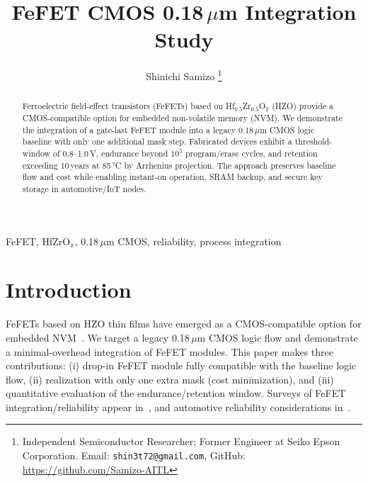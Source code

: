 \documentclass[journal]{IEEEtran}
\begin{document}
\title{FeFET CMOS 0.18\,$\mu$m Integration Study}

\author{Shinichi Samizo%
\thanks{Independent Semiconductor Researcher; Former Engineer at Seiko Epson Corporation.%
\newline Email: \texttt{shin3t72@gmail.com}, GitHub: \url{https://github.com/Samizo-AITL}}}

\maketitle

\begin{abstract}
Ferroelectric field-effect transistors (FeFETs) based on Hf$_{0.5}$Zr$_{0.5}$O$_2$ (HZO) provide a CMOS-compatible option for embedded non-volatile memory (NVM). We demonstrate the integration of a gate-last FeFET module into a legacy 0.18\,$\mu$m CMOS logic baseline with only one additional mask step. Fabricated devices exhibit a threshold-window of 0.8–1.0\,V, endurance beyond $10^5$ program/erase cycles, and retention exceeding 10\,years at 85\,\si{\celsius} by Arrhenius projection. The approach preserves baseline flow and cost while enabling instant-on operation, SRAM backup, and secure key storage in automotive/IoT nodes.
\end{abstract}

\begin{IEEEkeywords}
FeFET, HfZrO$_x$, 0.18\,$\mu$m CMOS, reliability, process integration
\end{IEEEkeywords}

\section{Introduction}
FeFETs based on HZO thin films have emerged as a CMOS-compatible option for embedded NVM~\cite{Boescke2011,Mueller2012,Schenk2019}. We target a legacy 0.18\,$\mu$m CMOS logic flow and demonstrate a minimal-overhead integration of FeFET modules. This paper makes three contributions: (i) drop-in FeFET module fully compatible with the baseline logic flow, (ii) realization with only one extra mask (cost minimization), and (iii) quantitative evaluation of the endurance/retention window. Surveys of FeFET integration/reliability appear in~\cite{Mueller2012,Mueller2015}, and automotive reliability considerations in~\cite{Nakamura2003}.

\end{document}
